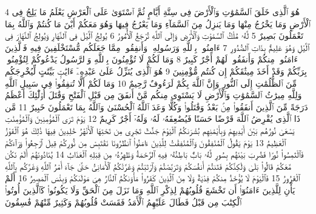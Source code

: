 {\tiny\colorbox{cl_aya}{4}} هُوَ ٱلَّذِى خَلَقَ ٱلسَّمَٰوَٰتِ وَٱلْأَرْضَ فِى سِتَّةِ أَيَّامٍ ثُمَّ ٱسْتَوَىٰ عَلَى ٱلْعَرْشِ يَعْلَمُ مَا يَلِجُ فِى ٱلْأَرْضِ وَمَا يَخْرُجُ مِنْهَا وَمَا يَنزِلُ مِنَ ٱلسَّمَآءِ وَمَا يَعْرُجُ فِيهَا وَهُوَ مَعَكُمْ أَيْنَ مَا كُنتُمْ وَٱللَّهُ بِمَا تَعْمَلُونَ بَصِيرٌ
{\tiny\colorbox{cl_aya}{5}} لَّهُۥ مُلْكُ ٱلسَّمَٰوَٰتِ وَٱلْأَرْضِ وَإِلَى ٱللَّهِ تُرْجَعُ ٱلْأُمُورُ
{\tiny\colorbox{cl_aya}{6}} يُولِجُ ٱلَّيْلَ فِى ٱلنَّهَارِ وَيُولِجُ ٱلنَّهَارَ فِى ٱلَّيْلِ وَهُوَ عَلِيمٌۢ بِذَاتِ ٱلصُّدُورِ
{\tiny\colorbox{cl_aya}{7}} ءَامِنُوا۟ بِٱللَّهِ وَرَسُولِهِۦ وَأَنفِقُوا۟ مِمَّا جَعَلَكُم مُّسْتَخْلَفِينَ فِيهِ فَٱلَّذِينَ ءَامَنُوا۟ مِنكُمْ وَأَنفَقُوا۟ لَهُمْ أَجْرٌ كَبِيرٌ
{\tiny\colorbox{cl_aya}{8}} وَمَا لَكُمْ لَا تُؤْمِنُونَ بِٱللَّهِ وَٱلرَّسُولُ يَدْعُوكُمْ لِتُؤْمِنُوا۟ بِرَبِّكُمْ وَقَدْ أَخَذَ مِيثَٰقَكُمْ إِن كُنتُم مُّؤْمِنِينَ
{\tiny\colorbox{cl_aya}{9}} هُوَ ٱلَّذِى يُنَزِّلُ عَلَىٰ عَبْدِهِۦٓ ءَايَٰتٍۭ بَيِّنَٰتٍ لِّيُخْرِجَكُم مِّنَ ٱلظُّلُمَٰتِ إِلَى ٱلنُّورِ وَإِنَّ ٱللَّهَ بِكُمْ لَرَءُوفٌ رَّحِيمٌ
{\tiny\colorbox{cl_aya}{10}} وَمَا لَكُمْ أَلَّا تُنفِقُوا۟ فِى سَبِيلِ ٱللَّهِ وَلِلَّهِ مِيرَٰثُ ٱلسَّمَٰوَٰتِ وَٱلْأَرْضِ لَا يَسْتَوِى مِنكُم مَّنْ أَنفَقَ مِن قَبْلِ ٱلْفَتْحِ وَقَٰتَلَ أُو۟لَٰٓئِكَ أَعْظَمُ دَرَجَةً مِّنَ ٱلَّذِينَ أَنفَقُوا۟ مِنۢ بَعْدُ وَقَٰتَلُوا۟ وَكُلًّا وَعَدَ ٱللَّهُ ٱلْحُسْنَىٰ وَٱللَّهُ بِمَا تَعْمَلُونَ خَبِيرٌ
{\tiny\colorbox{cl_aya}{11}} مَّن ذَا ٱلَّذِى يُقْرِضُ ٱللَّهَ قَرْضًا حَسَنًا فَيُضَٰعِفَهُۥ لَهُۥ وَلَهُۥٓ أَجْرٌ كَرِيمٌ
{\tiny\colorbox{cl_aya}{12}} يَوْمَ تَرَى ٱلْمُؤْمِنِينَ وَٱلْمُؤْمِنَٰتِ يَسْعَىٰ نُورُهُم بَيْنَ أَيْدِيهِمْ وَبِأَيْمَٰنِهِم بُشْرَىٰكُمُ ٱلْيَوْمَ جَنَّٰتٌ تَجْرِى مِن تَحْتِهَا ٱلْأَنْهَٰرُ خَٰلِدِينَ فِيهَا ذَٰلِكَ هُوَ ٱلْفَوْزُ ٱلْعَظِيمُ
{\tiny\colorbox{cl_aya}{13}} يَوْمَ يَقُولُ ٱلْمُنَٰفِقُونَ وَٱلْمُنَٰفِقَٰتُ لِلَّذِينَ ءَامَنُوا۟ ٱنظُرُونَا نَقْتَبِسْ مِن نُّورِكُمْ قِيلَ ٱرْجِعُوا۟ وَرَآءَكُمْ فَٱلْتَمِسُوا۟ نُورًا فَضُرِبَ بَيْنَهُم بِسُورٍ لَّهُۥ بَابٌۢ بَاطِنُهُۥ فِيهِ ٱلرَّحْمَةُ وَظَٰهِرُهُۥ مِن قِبَلِهِ ٱلْعَذَابُ
{\tiny\colorbox{cl_aya}{14}} يُنَادُونَهُمْ أَلَمْ نَكُن مَّعَكُمْ قَالُوا۟ بَلَىٰ وَلَٰكِنَّكُمْ فَتَنتُمْ أَنفُسَكُمْ وَتَرَبَّصْتُمْ وَٱرْتَبْتُمْ وَغَرَّتْكُمُ ٱلْأَمَانِىُّ حَتَّىٰ جَآءَ أَمْرُ ٱللَّهِ وَغَرَّكُم بِٱللَّهِ ٱلْغَرُورُ
{\tiny\colorbox{cl_aya}{15}} فَٱلْيَوْمَ لَا يُؤْخَذُ مِنكُمْ فِدْيَةٌ وَلَا مِنَ ٱلَّذِينَ كَفَرُوا۟ مَأْوَىٰكُمُ ٱلنَّارُ هِىَ مَوْلَىٰكُمْ وَبِئْسَ ٱلْمَصِيرُ
{\tiny\colorbox{cl_aya}{16}} أَلَمْ يَأْنِ لِلَّذِينَ ءَامَنُوٓا۟ أَن تَخْشَعَ قُلُوبُهُمْ لِذِكْرِ ٱللَّهِ وَمَا نَزَلَ مِنَ ٱلْحَقِّ وَلَا يَكُونُوا۟ كَٱلَّذِينَ أُوتُوا۟ ٱلْكِتَٰبَ مِن قَبْلُ فَطَالَ عَلَيْهِمُ ٱلْأَمَدُ فَقَسَتْ قُلُوبُهُمْ وَكَثِيرٌ مِّنْهُمْ فَٰسِقُونَ
